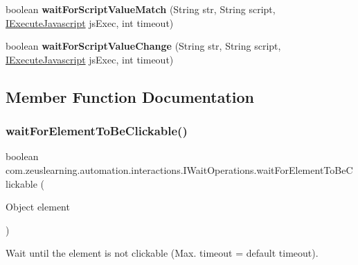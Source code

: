 \begin{DoxyCompactItemize}
boolean {\bfseries wait\+For\+Script\+Value\+Match} (String str, String script, \hyperlink{interfacecom_1_1zeuslearning_1_1automation_1_1interactions_1_1IExecuteJavascript}{I\+Execute\+Javascript} js\+Exec, int timeout)
\item 
\hypertarget{interfacecom_1_1zeuslearning_1_1automation_1_1interactions_1_1IWaitOperations_a909a362344d14a24262c26197c87d230}{}\label{interfacecom_1_1zeuslearning_1_1automation_1_1interactions_1_1IWaitOperations_a909a362344d14a24262c26197c87d230} 
boolean {\bfseries wait\+For\+Script\+Value\+Change} (String str, String script, \hyperlink{interfacecom_1_1zeuslearning_1_1automation_1_1interactions_1_1IExecuteJavascript}{I\+Execute\+Javascript} js\+Exec, int timeout)
\end{DoxyCompactItemize}


\subsection{Member Function Documentation}
\hypertarget{interfacecom_1_1zeuslearning_1_1automation_1_1interactions_1_1IWaitOperations_a224899aff622d5bbc4f7e76761413dc9}{}\label{interfacecom_1_1zeuslearning_1_1automation_1_1interactions_1_1IWaitOperations_a224899aff622d5bbc4f7e76761413dc9} 
\subsubsection{\texorpdfstring{wait\+For\+Element\+To\+Be\+Clickable()}{waitForElementToBeClickable()}\hspace{0.1cm}{\footnotesize\ttfamily [1/2]}}
{\footnotesize\ttfamily boolean com.\+zeuslearning.\+automation.\+interactions.\+I\+Wait\+Operations.\+wait\+For\+Element\+To\+Be\+Clickable (\begin{DoxyParamCaption}\item[{Object}]{element }\end{DoxyParamCaption})}

Wait until the element is not clickable (Max. timeout = default timeout).


